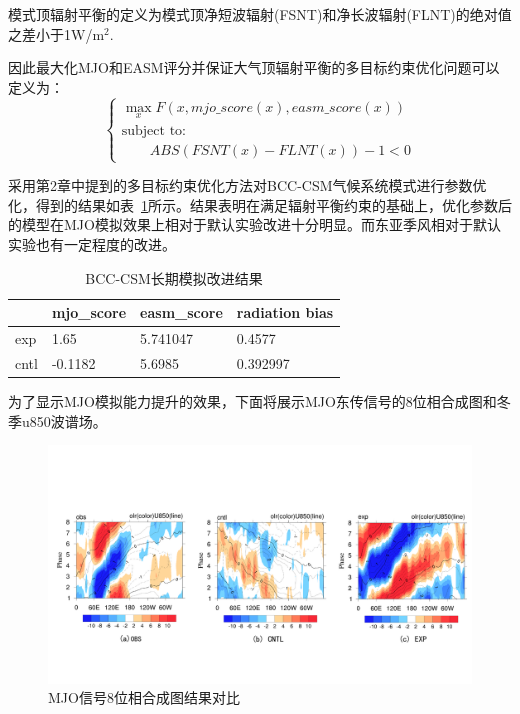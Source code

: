 模式顶辐射平衡的定义为模式顶净短波辐射(FSNT)和净长波辐射(FLNT)的绝对值之差小于1W/m$^2$.

因此最大化MJO和EASM评分并保证大气顶辐射平衡的多目标约束优化问题可以定义为：
\begin{equation}
\begin{cases}
 \max_{{x}} F({x},mjo\_score(x),easm\_score(x)) \\
      \text{subject to:} \\
       \qquad  ABS(FSNT(x)-FLNT(x)) - 1  <  0
\end{cases}
\end{equation}

采用第2章中提到的多目标约束优化方法对BCC-CSM气候系统模式进行参数优化，得到的结果如表~\ref{bccoptresult}所示。结果表明在满足辐射平衡约束的基础上，优化参数后的模型在MJO模拟效果上相对于默认实验改进十分明显。而东亚季风相对于默认实验也有一定程度的改进。
\begin{table}[H]
\label{table:reslutofBCC}
\centering
\caption{BCC-CSM长期模拟改进结果}  
\begin{tabular}{llll}  
\toprule[1.5pt]
\centering
  & mjo\_score & easm\_score  & radiation bias\\  
\hline  
    exp      & 1.65     & 5.741047 & 0.4577 \\
    cntl     & -0.1182  & 5.6985   & 0.392997 \\
\bottomrule[1.5pt]  
\end{tabular}  
\label{bccoptresult}
\end{table}
为了显示MJO模拟能力提升的效果，下面将展示MJO东传信号的8位相合成图和冬季u850波谱场。

\begin{figure}[H] %
  \centering
  \includegraphics[scale=0.46,trim=20 85 10 150,clip]{figures/phase.pdf}
  \caption{MJO信号8位相合成图结果对比}
  \label{fig:mjo phase}
\end{figure}

